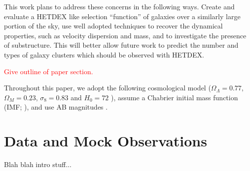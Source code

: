 \documentclass[apj, revtex4]{emulateapj}
\newcommand{\editorial}[1]{\textcolor{red}{#1}}
\begin{document}
This work plans to address these concerns in the following ways. Create and evaluate a HETDEX like selection ``function'' of galaxies over a similarly large portion of the sky, use well adopted techniques to recover the dynamical properties, such as velocity dispersion and mass, and to investigate the presence of substructure. This will better allow future work to predict the number and types of galaxy clusters which should be observed with HETDEX.

\editorial{Give outline of paper section.}

Throughout this paper, we adopt the following cosmological model ($\Omega_\Lambda = 0.77$,
$\Omega_M = 0.23$, $\sigma_8 = 0.83$ and $H_0= 72$ \kms \mpc), assume a Chabrier initial mass function (IMF; \citealt{Chabrier2003}), and use AB magnitudes \citep{Oke1974}.


\section{Data and Mock Observations}

Blah blah intro stuff... 
\end{document}
